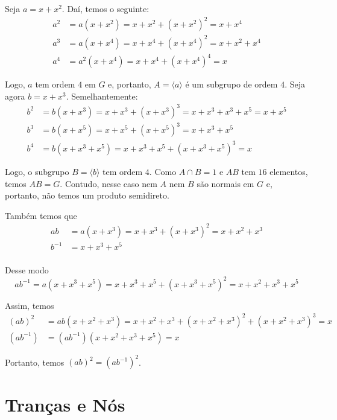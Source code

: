 \documentclass[a4paper,portuguese,11pt,twoside, leqno]{book}
\theoremstyle{definition}
\begin{document}
	\par\vspace{0.3cm} Seja $a = x+x^2$. Daí, temos o seguinte:
	\begin{align*}
	a^2 &= a(x+x^2) = x+x^2+(x+x^2)^2 = x+x^4 \\
	a^3 &= a(x+x^4) = x+x^4+(x+x^4)^2 = x+x^2+x^4 \\
	a^4 &= a^2(x+x^4) = x+x^4+(x+x^4)^4 = x
	\end{align*}
	\par\vspace{0.3cm} Logo, $a$ tem ordem $4$ em $G$ e, portanto, $A = \langle a \rangle$ é um subgrupo de ordem $4$. Seja agora $b = x+x^3$. Semelhantemente:
	\begin{align*}
	b^2 &= b(x+x^3) = x+x^3 + (x+x^3)^3 = x+x^3+x^3+x^5 = x+x^5 \\
	b^3 &= b(x+x^5) = x+x^5+(x+x^5)^3 = x+x^3+x^5 \\
	b^4 &= b(x+x^3+x^5) = x+x^3+x^5+(x+x^3+x^5)^3 = x
	\end{align*}
	\par\vspace{0.3cm} Logo, o subgrupo $B = \langle b \rangle$ tem ordem $4$. Como $A\cap B = 1$ e $AB$ tem $16$ elementos, temos $AB=G$. Contudo, nesse caso nem $A$ nem $B$ são normais em $G$ e, portanto, não temos um produto semidireto. 
	\par\vspace{0.3cm} Também temos que
	\begin{align*}
	ab &= a(x+x^3) = x+x^3+(x+x^3)^2 = x+x^2+x^3 \\
	b^{-1} &= x+x^3+x^5 \\
	\end{align*}
	\par Desse modo
	\begin{equation*}
	ab^{-1} = a(x+x^3+x^5) = x+x^3+x^5+(x+x^3+x^5)^2 = x+x^2+x^3+x^5
	\end{equation*}
	\par\vspace{0.3cm} Assim, temos
	\begin{align*}
	(ab)^2 &= ab(x+x^2+x^3) = x+x^2+x^3 + (x+x^2+x^3)^2 + (x+x^2+x^3)^3 = x \\
	(ab^{-1}) &= (ab^{-1})(x+x^2+x^3+x^5) = x
	\end{align*}
	\par\vspace{0.3cm} Portanto, temos $(ab)^2=(ab^{-1})^2$.
	
	
	\part{Tranças e Nós}
\end{document}
